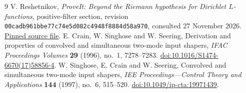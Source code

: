 \documentclass[11pt,a4paper]{article}
\theoremstyle{remark}\newtheorem{remark}[theorem]{Remark}
\begin{document}
\begin{thebibliography}{9}
 V. Reshetnikov, \emph{ProveIt: Beyond the Riemann hypothesis for Dirichlet $L$-functions}, positive-filter section, revision \texttt{00cadb961bbe77c74e5d082c4948f8884d58a970}, consulted 27 November 2026.
\href{https://github.com/VladimirReshetnikov/ProveIt/blob/00cadb961bbe77c74e5d082c4948f8884d58a970/Analysis/GeneralizedRiemannHypothesis/Article/sections/fil.tex}{Pinned source file}.
 E. Crain, W. Singhose and W. Seering, Derivation and properties of convolved and simultaneous two-mode input shapers, \emph{IFAC Proceedings Volumes} \textbf{29} (1996), no.~1, 7278--7283.
\href{https://doi.org/10.1016/S1474-6670(17)58856-4}{doi:10.1016/S1474-6670(17)58856-4}.
 W. Singhose, E. Crain and W. Seering, Convolved and simultaneous two-mode input shapers, \emph{IEE Proceedings---Control Theory and Applications} \textbf{144} (1997), no.~6, 515--520.
\href{https://doi.org/10.1049/ip-cta:19971439}{doi:10.1049/ip-cta:19971439}.
\end{thebibliography}
\end{document}
